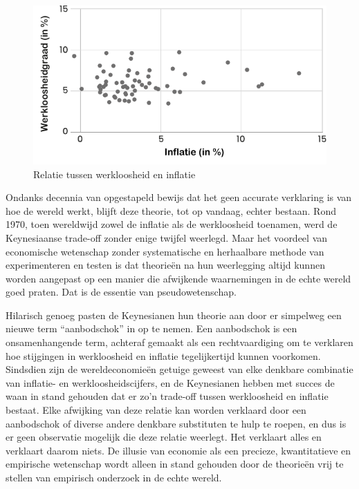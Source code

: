 \begin{figure}[!htb]
\centering
    \includegraphics[width=\textwidth]{figures/fig1.pdf}
\caption[Relatie tussen werkloosheid en inflatie]{Relatie tussen werkloosheid en inflatie\footnotemark}
\label{fig1}
\end{figure}


Ondanks decennia van opgestapeld bewijs dat het geen accurate verklaring is van hoe de wereld werkt, blijft deze theorie, tot op vandaag, echter bestaan. Rond 1970, toen wereldwijd zowel de inflatie als de werkloosheid toenamen, werd de Keynesiaanse trade-off zonder enige twijfel weerlegd. Maar het voordeel van economische wetenschap zonder systematische en herhaalbare methode van experimenteren en testen is dat theorieën na hun weerlegging altijd kunnen worden aangepast op een manier die afwijkende waarnemingen in de echte wereld goed praten. Dat is de essentie van pseudowetenschap.

Hilarisch genoeg pasten de Keynesianen hun theorie aan door er simpelweg een nieuwe term ``aanbodschok'' in op te nemen. Een aanbodschok is een onsamenhangende term, achteraf gemaakt als een rechtvaardiging om te verklaren hoe stijgingen in werkloosheid en inflatie tegelijkertijd kunnen voorkomen. Sindsdien zijn de wereldeconomieën getuige geweest van elke denkbare combinatie van inflatie- en werkloosheidscijfers, en de Keynesianen hebben met succes de waan in stand gehouden dat er zo’n trade-off tussen werkloosheid en inflatie bestaat. Elke afwijking van deze relatie kan worden verklaard door een aanbodschok of diverse andere denkbare substituten te hulp te roepen, en dus is er geen observatie mogelijk die deze relatie weerlegt. Het verklaart alles en verklaart daarom niets. De illusie van economie als een precieze, kwantitatieve en empirische wetenschap wordt alleen in stand gehouden door de theorieën vrij te stellen van empirisch onderzoek in de echte wereld.

